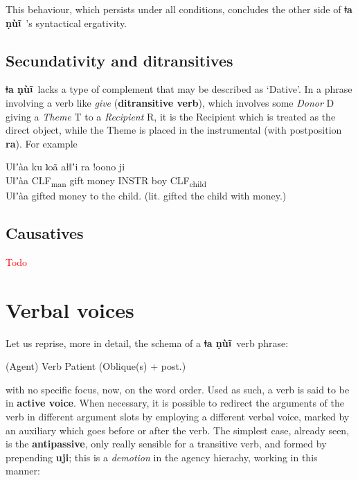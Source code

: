 \documentclass[11pt]{book}
\newcommand{\qcn}[1]{\textbf{#1}}
\newcommand{\langname}{\qcn{ǂa ṇùĩ}~}
\newcommand{\grammsc}[1]{\textsc{#1}}
\newcommand{\CLF}[1]{\grammsc{CLF}\textsubscript{#1}}
\newcommand{\cmnt}[1]{\textcolor{red}{#1}}
\begin{document}
This behaviour, which persists under all conditions, concludes the other side of \langname's syntactical ergativity.

\subsection{Secundativity and ditransitives}

\langname lacks a type of complement that may be described as `Dative'. In a phrase involving a verb like \emph{give} (\textbf{ditransitive verb}), which involves some \emph{Donor} D giving a \emph{Theme} T to a \emph{Recipient} R, it is the Recipient which is treated as the direct object, while the Theme is placed in the instrumental (with postposition \qcn{ra}). For example

\begin{exe}
\ex
\gll Uǁʼàa ku ʇoã ałǁʼi ra  !oono 	ji\\
Uǁʼàa \CLF{man} gift money INSTR boy \CLF{child}\\
\glt Uǁʼàa gifted money to the child. (lit. gifted the child with money.)
\end{exe}



\subsection{Causatives}

\cmnt{Todo}

\section{Verbal voices}\label{sec:valencychanging}

Let us reprise, more in detail, the schema of a \langname verb phrase:

\begin{center}
(Agent) Verb Patient (Oblique(s) + post.)
\end{center}

with no specific focus, now, on the word order. Used as such, a verb is said to be in \textbf{active voice}. When necessary, it is possible to redirect the arguments of the verb in different argument slots by employing a different verbal voice, marked by an auxiliary which goes before or after the verb. The simplest case, already seen, is the \textbf{antipassive}, only really sensible for a transitive verb, and formed by prepending \qcn{uji}; this is a \emph{demotion} in the agency hierachy, working in this manner:
\end{document}
